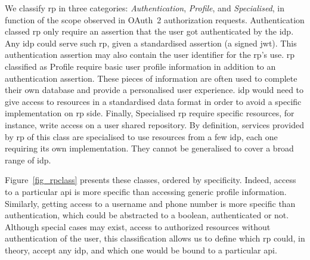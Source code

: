 We classify \gls{rp} in three categories: \textit{Authentication}, \textit{Profile}, and \textit{Specialised}, in function of the scope observed in OAuth~2 authorization requests.
Authentication classed \gls{rp} only require an assertion that the user got authenticated by the \gls{idp}.
Any \gls{idp} could serve such \gls{rp}, given a standardised assertion (\eg a signed \gls{jwt}).
This authentication assertion may also contain the user identifier for the \gls{rp}'s use.
\gls{rp} classified as Profile require basic user profile information in addition to an authentication assertion.
These pieces of information are often used to complete their own database and provide a personalised user experience.
\gls{idp} would need to give access to resources in a standardised data format in order to avoid a specific implementation on \gls{rp} side.
Finally, Specialised \gls{rp} require specific resources, for instance, write access on a user shared repository.
By definition, services provided by \gls{rp} of this class are specialised to use resources from a few \gls{idp}, each one requiring its own implementation.
They cannot be generalised to cover a broad range of \gls{idp}.

Figure~\ref{fig_rpclass} presents these classes, ordered by specificity. 
Indeed, access to a particular \gls{api} is more specific than accessing generic profile information.
Similarly, getting access to a username and phone number is more specific than authentication, which could be abstracted to a boolean, \ie authenticated or not.
Although special cases may exist, \eg access to authorized resources without authentication of the user, this classification allows us to define which \gls{rp} could, in theory, accept any \gls{idp}, and which one would be bound to a particular \gls{api}.

